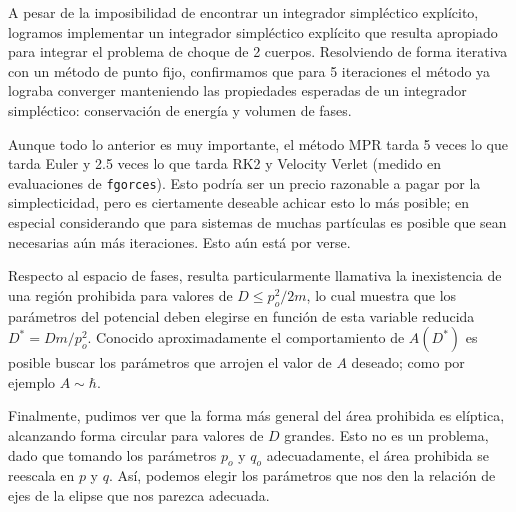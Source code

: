 \documentclass[twoside, 12pt]{article}
\begin{document}
A pesar de la imposibilidad de encontrar un integrador simpléctico explícito, logramos implementar un integrador simpléctico explícito que resulta apropiado para integrar el problema de choque de 2 cuerpos.
Resolviendo de forma iterativa con un método de punto fijo, confirmamos que para 5 iteraciones el método ya lograba converger manteniendo las propiedades esperadas de un integrador simpléctico: conservación
de energía y volumen de fases.

Aunque todo lo anterior es muy importante, el método MPR tarda 5 veces lo que tarda Euler y 2.5 veces lo que tarda RK2 y Velocity Verlet (medido en evaluaciones de \texttt{fgorces}).
Esto podría ser un precio razonable a pagar por la simplecticidad, pero es ciertamente deseable achicar esto lo más posible; en especial considerando que para sistemas de muchas partículas es
posible que sean necesarias aún más iteraciones. Esto aún está por verse.

Respecto al espacio de fases, resulta particularmente llamativa la inexistencia de una región prohibida para valores de $D \leq p_o^2/2m$, lo cual muestra que los parámetros del potencial deben elegirse
en función de esta variable reducida $D^* = Dm/p_o^2$. Conocido aproximadamente el comportamiento de $A(D^*)$ es posible buscar los parámetros que arrojen el valor de $A$ deseado; como por ejemplo $A\sim\hbar$.

Finalmente, pudimos ver que la forma más general del área prohibida es elíptica, alcanzando forma circular para valores de $D$ grandes.
Esto no es un problema, dado que tomando los parámetros $p_o$ y $q_o$ adecuadamente, el área prohibida se reescala en $p$ y $q$.
Así, podemos elegir los parámetros que nos den la relación de ejes de la elipse que nos parezca adecuada.
\end{document}
